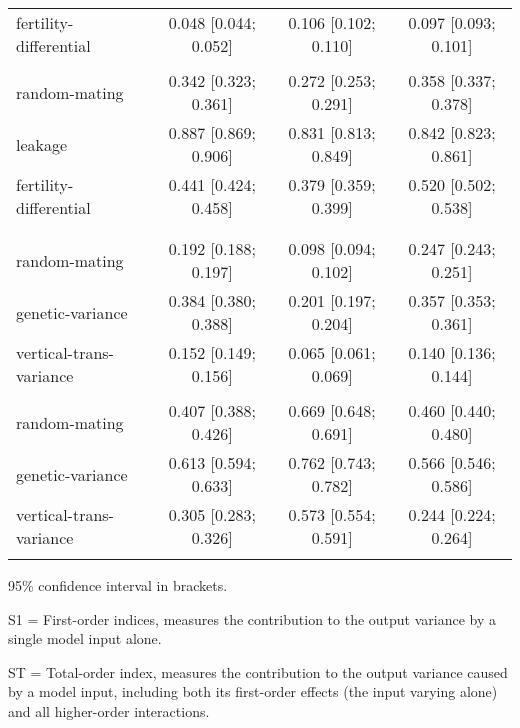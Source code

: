 \begin{table}[htp]
\begin{threeparttable}
\begin{tabular}{lccc}
	\hspace{1.5em} fertility-differential & 0.048 [0.044; 0.052] & 0.106 [0.102; 0.110] & 0.097 [0.093; 0.101]\\
\addlinespace[12pt]
\multicolumn{4}{l}{\hspace{1em} ST} \\ 
\hspace{1.5em} random-mating & 0.342 [0.323; 0.361] & 0.272 [0.253; 0.291] & 0.358 [0.337; 0.378]\\ 
	\hspace{1.5em} leakage & 0.887 [0.869; 0.906] & 0.831 [0.813; 0.849] & 0.842 [0.823; 0.861]\\ 
	\hspace{1.5em} fertility-differential & 0.441 [0.424; 0.458] & 0.379 [0.359; 0.399] & 0.520 [0.502; 0.538]\\ 
\addlinespace[12pt]
    \multicolumn{4}{l}{\textbf{Scenario 3 (genes and vertical transmission)}} \\
    \addlinespace[6pt]
    \multicolumn{4}{l}{\hspace{1em} S1} \\
\hspace{1.5em} random-mating & 0.192 [0.188; 0.197] & 0.098 [0.094; 0.102] & 0.247 [0.243; 0.251]\\ 
	\hspace{1.5em} genetic-variance & 0.384 [0.380; 0.388] & 0.201 [0.197; 0.204] & 0.357 [0.353; 0.361]\\ 
	\hspace{1.5em} vertical-trans-variance & 0.152 [0.149; 0.156] & 0.065 [0.061; 0.069] & 0.140 [0.136; 0.144]\\
\addlinespace[12pt]
\multicolumn{4}{l}{\hspace{1em} ST} \\ 
\hspace{1.5em} random-mating & 0.407 [0.388; 0.426] & 0.669 [0.648; 0.691] & 0.460 [0.440; 0.480]\\ 
	\hspace{1.5em} genetic-variance & 0.613 [0.594; 0.633] & 0.762 [0.743; 0.782] & 0.566 [0.546; 0.586]\\ 
	\hspace{1.5em} vertical-trans-variance & 0.305 [0.283; 0.326] & 0.573 [0.554; 0.591] & 0.244 [0.224; 0.264]\\
\addlinespace
\hline
\end{tabular}
\begin{tablenotes}
\scriptsize
\item 95\% confidence interval in brackets.
\item S1 = First-order indices,  measures the contribution to the output variance by a single model input alone.
\item ST = Total-order index, measures the contribution to the output variance caused by a model input, including both its first-order effects (the input varying alone) and all higher-order interactions.
\end{tablenotes}
\end{threeparttable}
\end{table}